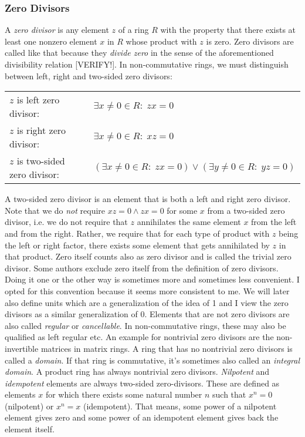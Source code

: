 



\subsubsection{Zero Divisors}
A \emph{zero divisor} is any element $z$ of a ring $R$ with the property that there exists at least one nonzero element $x$ in $R$ whose product with $z$ is zero. Zero divisors are called like that because they \emph{divide zero} in the sense of the aforementioned divisibility relation [VERIFY!]. In non-commutative rings, we must distinguish between left, right and two-sided zero divisors:

\medskip
\begin{tabular}{l l}
$z$ is left zero divisor:       & $\exists x \neq 0 \in R: \; z x = 0$  \\
$z$ is right zero divisor:      & $\exists x \neq 0 \in R: \; x z = 0$  \\
$z$ is two-sided zero divisor:  & $(\exists x \neq 0 \in R: \; z x = 0) 
                              \vee (\exists y \neq 0 \in R: \; y z = 0)$  \\
\end{tabular}
\medskip

A two-sided zero divisor is an element that is both a left and right zero divisor. Note that we do \emph{not} require $x z = 0 \wedge z x = 0$ for some $x$ from a two-sided zero divisor, i.e. we do not require that $z$ annihilates the same element $x$ from the left and from the right. Rather, we require that for each type of product with $z$ being the left or right factor, there exists some element that gets annihilated by $z$ in that product. Zero itself counts also as zero divisor and is called the trivial zero divisor. Some authors exclude zero itself from the definition of zero divisors. Doing it one or the other way is sometimes more and sometimes less convenient. I opted for this convention because it seems more consistent to me. We will later also define units which are a generalization of the idea of 1 and I view the zero divisors as a similar generalization of 0. Elements that are not zero divisors are also called \emph{regular} or \emph{cancellable}. In non-commutative rings, these may also be qualified as left regular etc. An example for nontrivial zero divisors are the non-invertible matrices in matrix rings. A ring that has no nontrivial zero divisors is called a \emph{domain}. If that ring is commutative, it's sometimes also called an \emph{integral domain}. A product ring has always nontrivial zero divisors. \emph{Nilpotent} and \emph{idempotent} elements are always two-sided zero-divisors. These are defined as elements $x$ for which there exists some natural number $n$ such that $x^n = 0$ (nilpotent) or $x^n = x$ (idempotent). That means, some power of a nilpotent element gives zero and some power of an idempotent element gives back the element itself.

